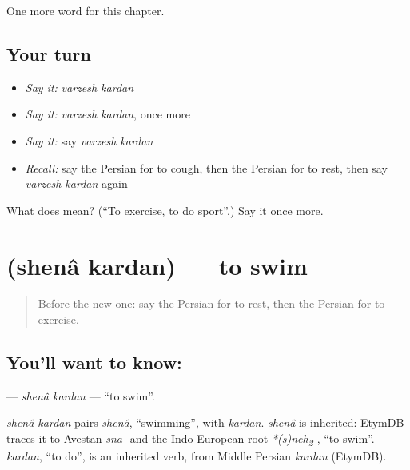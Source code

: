 \begin{grammarlens}[title={What you've built}]
One more word for this chapter.
\end{grammarlens}

\subsection*{Your turn}
\begin{itemize}
\raggedright
  \item \emph{Say it:} \emph{varzesh kardan}
  \item \emph{Say it:} \emph{varzesh kardan}, once more
  \item \emph{Say it:} say \emph{varzesh kardan}
  \item \emph{Recall:} say the Persian for to cough, then the Persian for to rest, then say \emph{varzesh kardan} again
\end{itemize}

\begin{tcolorbox}[breakable,colback=teal!4,colframe=teal!35!black,title={Before you move on}]
What does   mean? (\textquotedblleft{}To exercise, to do sport\textquotedblright{}.) Say it once more.
\end{tcolorbox}
\section[\texorpdfstring{\fa{شنا} \fa{کردن} (shenâ kardan)}{شنا کردن (shenâ kardan)}]{  (shenâ kardan) — to swim}

\label{lesson:FA-C218-shena-kardan}



\begin{quote}
Before the new one: say the Persian for to rest, then the Persian for to exercise.
\end{quote}

\subsection*{You'll want to know:  }
\textbf{ } — \emph{shenâ kardan} — \textquotedblleft{}to swim\textquotedblright{}.

\begin{cousinweb}
\emph{shenâ kardan} pairs \emph{shenâ}, \textquotedblleft{}swimming\textquotedblright{}, with \emph{kardan}. \emph{shenâ} is inherited: EtymDB traces it to Avestan \emph{snā-} and the Indo-European root \emph{*(s)neh\textsubscript{2}-}, \textquotedblleft{}to swim\textquotedblright{}. \emph{kardan}, \textquotedblleft{}to do\textquotedblright{}, is an inherited verb, from Middle Persian \emph{kardan} (EtymDB).
\end{cousinweb}

